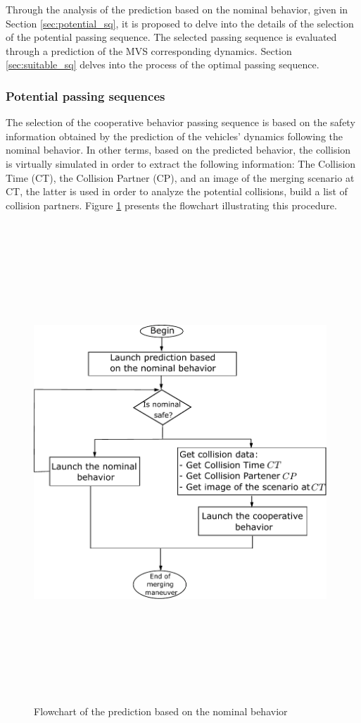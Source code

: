 Through the analysis of the prediction based on the nominal behavior, given in Section \ref{sec:potential_sq}, it is proposed to delve into the details of the selection of the potential passing sequence. The selected passing sequence is evaluated through a prediction of the MVS corresponding dynamics. Section \ref{sec:suitable_sq} delves into the process of the optimal passing sequence. 


\subsubsection*{Potential passing sequences} \label{sec:potential_sq}
The selection of the cooperative behavior passing sequence is based on the safety information obtained by the prediction of the vehicles' dynamics following the nominal behavior. In other terms, based on the predicted behavior, the collision is virtually simulated in order to extract the following information: The Collision Time (CT), the Collision Partner (CP), and an image of the merging scenario at CT, the latter is used in order to analyze the potential collisions, build a list of collision partners. Figure \ref{fig:prediction_based_nominal} presents the flowchart illustrating this procedure. 


         \begin{figure}[!h]
         \centering 
         \includegraphics[width=11cm,height=18cm,keepaspectratio]{chapters/Chapitre_6/Figures/STEP1_organi.pdf}
         \caption{Flowchart of the prediction based on the nominal behavior }
         \label{fig:prediction_based_nominal}
         \end{figure}




